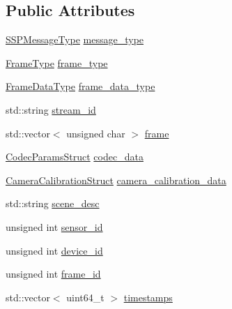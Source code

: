 \subsection*{Public Attributes}
\begin{DoxyCompactItemize}
\item 
\hyperlink{namespacemoetsi_1_1ssp_a8948545ffe48a5b3507fd10a1e56d546}{S\+S\+P\+Message\+Type} \hyperlink{structmoetsi_1_1ssp_1_1FrameStruct_a6c6ff38e4cbbf4e3af7cdcb6192e8ba8}{message\+\_\+type}
\item 
\hyperlink{namespacemoetsi_1_1ssp_a46efdfa2cd5a28ead465dcc8006b5a87}{Frame\+Type} \hyperlink{structmoetsi_1_1ssp_1_1FrameStruct_ac7fe0bfa84d7492827728c49544fc0a2}{frame\+\_\+type}
\item 
\hyperlink{namespacemoetsi_1_1ssp_aa9b059f0bc7a91855545ee887f2d56c4}{Frame\+Data\+Type} \hyperlink{structmoetsi_1_1ssp_1_1FrameStruct_a281ef582bcbb8b6b3d0f0eb3efd615c6}{frame\+\_\+data\+\_\+type}
\item 
std\+::string \hyperlink{structmoetsi_1_1ssp_1_1FrameStruct_a14a7976abfb26a9ca42e17555f8b1a8c}{stream\+\_\+id}
\item 
std\+::vector$<$ unsigned char $>$ \hyperlink{structmoetsi_1_1ssp_1_1FrameStruct_aded4a3fb94bc5aec4844cc9643b6a020}{frame}
\item 
\hyperlink{structmoetsi_1_1ssp_1_1CodecParamsStruct}{Codec\+Params\+Struct} \hyperlink{structmoetsi_1_1ssp_1_1FrameStruct_a84ed01cb3227bcece29c43ba8ec322ee}{codec\+\_\+data}
\item 
\hyperlink{structmoetsi_1_1ssp_1_1CameraCalibrationStruct}{Camera\+Calibration\+Struct} \hyperlink{structmoetsi_1_1ssp_1_1FrameStruct_acbdc93c52c66264ed3f4c06a088c955d}{camera\+\_\+calibration\+\_\+data}
\item 
std\+::string \hyperlink{structmoetsi_1_1ssp_1_1FrameStruct_a7e717ab7290ddbb430c3c5a8858ddac6}{scene\+\_\+desc}
\item 
unsigned int \hyperlink{structmoetsi_1_1ssp_1_1FrameStruct_ae585f1be534924a69c8617b2f5f83568}{sensor\+\_\+id}
\item 
unsigned int \hyperlink{structmoetsi_1_1ssp_1_1FrameStruct_af3b1ea702009be5df748af30a159a38a}{device\+\_\+id}
\item 
unsigned int \hyperlink{structmoetsi_1_1ssp_1_1FrameStruct_aebc84f95b5024225412d92a56ddf24ad}{frame\+\_\+id}
\item 
std\+::vector$<$ uint64\+\_\+t $>$ \hyperlink{structmoetsi_1_1ssp_1_1FrameStruct_a8509ad9c47a69d44dc572e5500973fda}{timestamps}
\end{DoxyCompactItemize}


